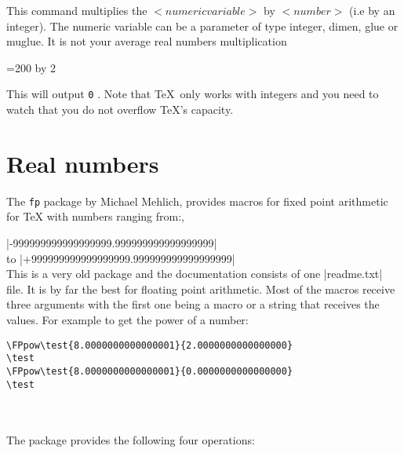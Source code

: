 This command multiplies the $<numeric variable>$ by $<number>$ (i.e by an integer). The numeric variable can be 
a parameter of type integer, dimen, glue or muglue. It is not your average real numbers multiplication

\begin{teXXX}
=200
\multiply {} by 2
\the{}
\end{teXXX}

This will output \texttt{0} . Note that \TeX\ only works with integers and you need to watch that you do not overflow \TeX 's capacity.


\section{Real numbers}

The \texttt{fp} package by Michael Mehlich, provides macros for fixed point arithmetic
for TeX with numbers ranging from:, 

    |-999999999999999999.999999999999999999|\\
to  |+999999999999999999.999999999999999999|\\


This is a very old package and the documentation consists of one |readme.txt| file. It is by far the best for floating point arithmetic. Most of the macros receive three arguments with the first one being a macro or a string that receives the values. For example to get the power of a number:

\begin{verbatim}
\FPpow\test{8.0000000000000001}{2.0000000000000000}
\test
\FPpow\test{8.0000000000000001}{0.0000000000000000}
\test
\end{verbatim}


\FPpow{}

\noindent\test\\
\FPpow{}
\test\\


The package provides the following four operations:



